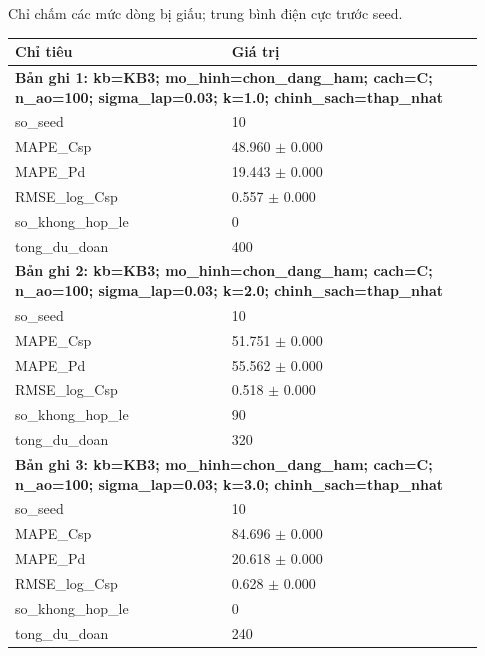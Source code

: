 \par\smallskip\noindent Chỉ chấm các mức dòng bị giấu; trung bình điện cực trước seed.\par
\begin{longtable}{p{0.43\linewidth}p{0.50\linewidth}}
\toprule Chỉ tiêu & Giá trị \\ \midrule \endhead
\multicolumn{2}{p{0.95\linewidth}}{\textbf{Bản ghi 1: kb=KB3; mo\_hinh=chon\_dang\_ham; cach=C; n\_ao=100; sigma\_lap=0.03; k=1.0; chinh\_sach=thap\_nhat}} \\
so\_\allowbreak seed & 10 \\
MAPE\_\allowbreak Csp & 48.960 $\pm$ 0.000 \\
MAPE\_\allowbreak Pd & 19.443 $\pm$ 0.000 \\
RMSE\_\allowbreak log\_\allowbreak Csp & 0.557 $\pm$ 0.000 \\
so\_\allowbreak khong\_\allowbreak hop\_\allowbreak le & 0 \\
tong\_\allowbreak du\_\allowbreak doan & 400 \\
\midrule
\multicolumn{2}{p{0.95\linewidth}}{\textbf{Bản ghi 2: kb=KB3; mo\_hinh=chon\_dang\_ham; cach=C; n\_ao=100; sigma\_lap=0.03; k=2.0; chinh\_sach=thap\_nhat}} \\
so\_\allowbreak seed & 10 \\
MAPE\_\allowbreak Csp & 51.751 $\pm$ 0.000 \\
MAPE\_\allowbreak Pd & 55.562 $\pm$ 0.000 \\
RMSE\_\allowbreak log\_\allowbreak Csp & 0.518 $\pm$ 0.000 \\
so\_\allowbreak khong\_\allowbreak hop\_\allowbreak le & 90 \\
tong\_\allowbreak du\_\allowbreak doan & 320 \\
\midrule
\multicolumn{2}{p{0.95\linewidth}}{\textbf{Bản ghi 3: kb=KB3; mo\_hinh=chon\_dang\_ham; cach=C; n\_ao=100; sigma\_lap=0.03; k=3.0; chinh\_sach=thap\_nhat}} \\
so\_\allowbreak seed & 10 \\
MAPE\_\allowbreak Csp & 84.696 $\pm$ 0.000 \\
MAPE\_\allowbreak Pd & 20.618 $\pm$ 0.000 \\
RMSE\_\allowbreak log\_\allowbreak Csp & 0.628 $\pm$ 0.000 \\
so\_\allowbreak khong\_\allowbreak hop\_\allowbreak le & 0 \\
tong\_\allowbreak du\_\allowbreak doan & 240 \\

\end{longtable}
